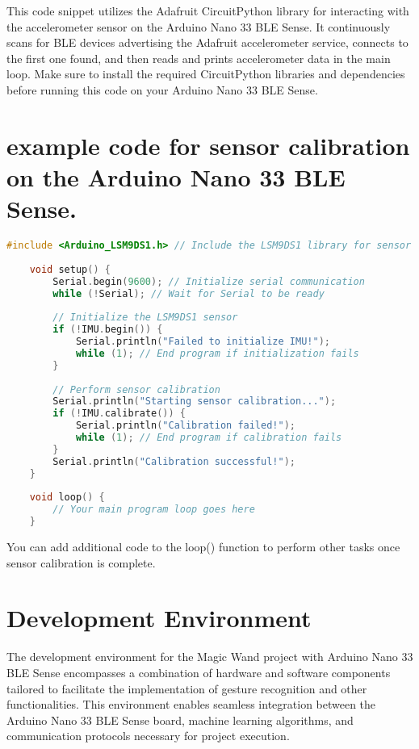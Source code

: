 This code snippet utilizes the Adafruit CircuitPython library for interacting with the accelerometer sensor on the Arduino Nano 33 BLE Sense. It continuously scans for BLE devices advertising the Adafruit accelerometer service, connects to the first one found, and then reads and prints accelerometer data in the main loop. Make sure to install the required CircuitPython libraries and dependencies before running this code on your Arduino Nano 33 BLE Sense.\cite{Harris:2023}


\section{example code for sensor calibration on the Arduino Nano 33 BLE Sense.}

\begin{lstlisting}[language=C++, caption={Sensor Calibration Example Code}, captionpos=b]
    #include <Arduino_LSM9DS1.h> // Include the LSM9DS1 library for sensor calibration
    
    void setup() {
        Serial.begin(9600); // Initialize serial communication
        while (!Serial); // Wait for Serial to be ready
        
        // Initialize the LSM9DS1 sensor
        if (!IMU.begin()) {
            Serial.println("Failed to initialize IMU!");
            while (1); // End program if initialization fails
        }
        
        // Perform sensor calibration
        Serial.println("Starting sensor calibration...");
        if (!IMU.calibrate()) {
            Serial.println("Calibration failed!");
            while (1); // End program if calibration fails
        }
        Serial.println("Calibration successful!");
    }
    
    void loop() {
        // Your main program loop goes here
    }
\end{lstlisting}

You can add additional code to the loop() function to perform other tasks once sensor calibration is complete.\cite{Rehder:2017}



	\section{Development Environment}

The development environment for the Magic Wand project with Arduino Nano 33 BLE Sense encompasses a combination of hardware and software components tailored to facilitate the implementation of gesture recognition and other functionalities. This environment enables seamless integration between the Arduino Nano 33 BLE Sense board, machine learning algorithms, and communication protocols necessary for project execution. \cite{ArduinoNanoGetStarted:2024}

